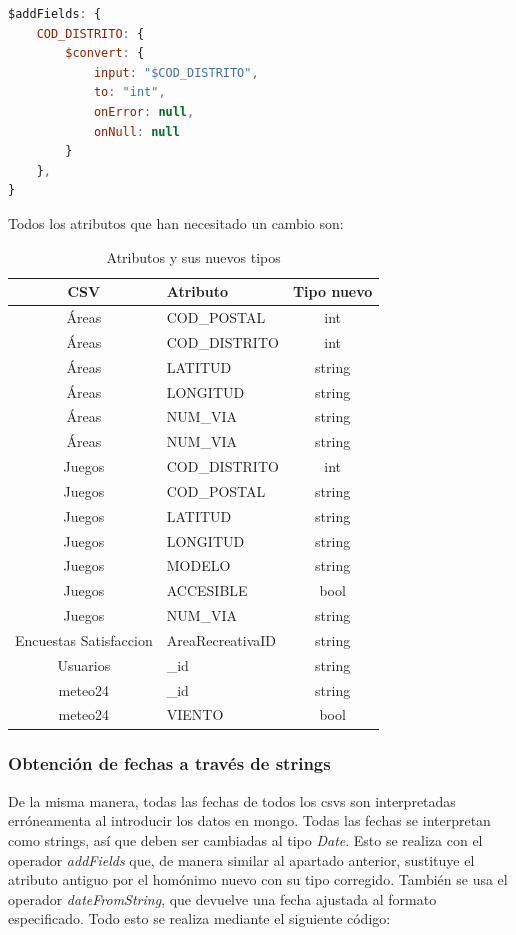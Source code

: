 \documentclass[]{article}
\begin{document}
\begin{lstlisting}[language=JavaScript, caption=Cambio de tipo genérico]
$addFields: {
    COD_DISTRITO: {
        $convert: {
            input: "$COD_DISTRITO",
            to: "int",
            onError: null,
            onNull: null
        }
    },
}
\end{lstlisting}

Todos los atributos que han necesitado un cambio son:

\begin{table}[H]
    \centering
    \begin{tabular}{| c | l | c |}
        \hline
        CSV & Atributo & Tipo nuevo \\ \hline 
        Áreas & COD\_POSTAL & int\\ 
        Áreas & COD\_DISTRITO & int\\ 
        Áreas & LATITUD & string\\ 
        Áreas & LONGITUD & string\\
        Áreas & NUM\_VIA & string\\ 
        Áreas & NUM\_VIA & string\\ 
        Juegos & COD\_DISTRITO & int\\ 
        Juegos & COD\_POSTAL & string\\ 
        Juegos & LATITUD & string\\ 
        Juegos & LONGITUD & string\\
        Juegos & MODELO & string\\ 
        Juegos & ACCESIBLE & bool\\ 
        Juegos & NUM\_VIA & string\\ 
        Encuestas Satisfaccion & AreaRecreativaID & string\\ 
        Usuarios & \_id & string\\ 
        meteo24 & \_id & string\\ 
        meteo24 & VIENTO & bool\\
        \hline
    \end{tabular}
    \caption{Atributos y sus nuevos tipos}
\end{table}

\subsubsection{Obtención de fechas a través de strings}
De la misma manera, todas las fechas de todos los csvs son interpretadas erróneamenta al introducir los datos en mongo. Todas las fechas se interpretan como strings, así que deben ser cambiadas al tipo \textit{Date}. Esto se realiza con el operador \textit{addFields} que, de manera similar al apartado anterior, sustituye el atributo antiguo por el homónimo nuevo con su tipo corregido. También se usa el operador \textit{dateFromString}, que devuelve una fecha ajustada al formato especificado. Todo esto se realiza mediante el siguiente código:
\end{document}
